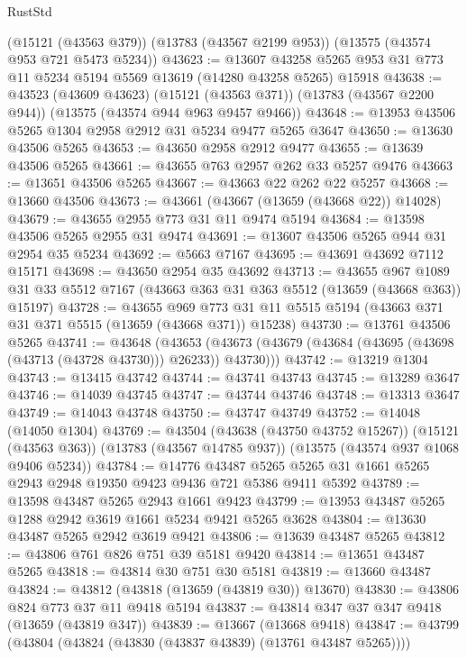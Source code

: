\begin{lexlean}{RustStd}
\begin{coremodule}
    (@15121 (@43563 @379))
    (@13783 (@43567 @2199 @953))
    (@13575 (@43574 @953 @721 @5473 @5234))
@43623 := @13607
    @43258
    @5265
    @953
    @31
    @773
    @11
    @5234
    @5194
    @5569
    @13619
    (@14280 @43258 @5265)
    @15918
@43638 := @43523
    (@43609 @43623)
    (@15121 (@43563 @371))
    (@13783 (@43567 @2200 @944))
    (@13575 (@43574 @944 @963 @9457 @9466))
@43648 := @13953 @43506 @5265 @1304 @2958 @2912 @31 @5234 @9477 @5265 @3647
@43650 := @13630 @43506 @5265
@43653 := @43650 @2958 @2912 @9477
@43655 := @13639 @43506 @5265
@43661 := @43655 @763 @2957 @262 @33 @5257 @9476
@43663 := @13651 @43506 @5265
@43667 := @43663 @22 @262 @22 @5257
@43668 := @13660 @43506
@43673 := @43661 (@43667 (@13659 (@43668 @22)) @14028)
@43679 := @43655 @2955 @773 @31 @11 @9474 @5194
@43684 := @13598 @43506 @5265 @2955 @31 @9474
@43691 := @13607 @43506 @5265 @944 @31 @2954 @35 @5234
@43692 := @5663 @7167
@43695 := @43691 @43692 @7112 @15171
@43698 := @43650 @2954 @35 @43692
@43713 := @43655
    @967
    @1089
    @31
    @33
    @5512
    @7167
    (@43663 @363 @31 @363 @5512 (@13659 (@43668 @363)) @15197)
@43728 := @43655
    @969
    @773
    @31
    @11
    @5515
    @5194
    (@43663 @371 @31 @371 @5515 (@13659 (@43668 @371)) @15238)
@43730 := @13761 @43506 @5265
@43741 := @43648
    (@43653 (@43673 (@43679 (@43684 (@43695 (@43698 (@43713 (@43728 @43730))) @26233)) @43730)))
@43742 := @13219 @1304
@43743 := @13415 @43742
@43744 := @43741 @43743
@43745 := @13289 @3647
@43746 := @14039 @43745
@43747 := @43744 @43746
@43748 := @13313 @3647
@43749 := @14043 @43748
@43750 := @43747 @43749
@43752 := @14048 (@14050 @1304)
@43769 := @43504
    (@43638 (@43750 @43752 @15267))
    (@15121 (@43563 @363))
    (@13783 (@43567 @14785 @937))
    (@13575 (@43574 @937 @1068 @9406 @5234))
@43784 := @14776
    @43487
    @5265
    @5265
    @31
    @1661
    @5265
    @2943
    @2948
    @19350
    @9423
    @9436
    @721
    @5386
    @9411
    @5392
@43789 := @13598 @43487 @5265 @2943 @1661 @9423
@43799 := @13953 @43487 @5265 @1288 @2942 @3619 @1661 @5234 @9421 @5265 @3628
@43804 := @13630 @43487 @5265 @2942 @3619 @9421
@43806 := @13639 @43487 @5265
@43812 := @43806 @761 @826 @751 @39 @5181 @9420
@43814 := @13651 @43487 @5265
@43818 := @43814 @30 @751 @30 @5181
@43819 := @13660 @43487
@43824 := @43812 (@43818 (@13659 (@43819 @30)) @13670)
@43830 := @43806 @824 @773 @37 @11 @9418 @5194
@43837 := @43814 @347 @37 @347 @9418 (@13659 (@43819 @347))
@43839 := @13667 (@13668 @9418)
@43847 := @43799 (@43804 (@43824 (@43830 (@43837 @43839) (@13761 @43487 @5265))))

\end{coremodule}
\end{lexlean}
